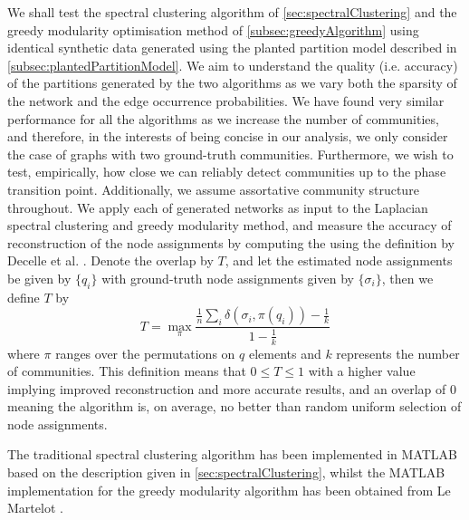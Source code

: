 We shall test the spectral clustering algorithm of \cref{sec:spectralClustering} and the greedy modularity optimisation method of \cref{subsec:greedyAlgorithm} using identical synthetic data generated using the planted partition model described in \cref{subsec:plantedPartitionModel}.
We aim to understand the quality (i.e. accuracy) of the partitions generated by the two algorithms as we vary both the sparsity of the network and the edge occurrence probabilities.
We have found very similar performance for all the algorithms as we increase the number of communities, and therefore, in the interests of being concise in our analysis, we only consider the case of graphs with two ground-truth communities.
Furthermore, we wish to test, empirically, how close we can reliably detect communities up to the phase transition point.
Additionally, we assume assortative community structure throughout.
We apply each of generated networks as input to the Laplacian spectral clustering and greedy modularity method, and measure the accuracy of reconstruction of the node assignments by computing the  using the definition by Decelle et al. \cite{DKM+11,DKM+13}.
Denote the overlap by $T$, and let the estimated node assignments be given by $\{q_{i}\}$ with ground-truth node assignments given by $\{\sigma_{i}\}$, then we define $T$ by
\begin{equation}
	\label{eq:overlap}
	T = \max_{\pi} \frac{\frac{1}{n} \sum_{i} \delta(\sigma_{i},\pi(q_{i})) - \frac{1}{k}}{1 - \frac{1}{k}}
\end{equation}
where $\pi$ ranges over the permutations on $q$ elements and $k$ represents the number of communities.
This definition means that $0 \le T \le 1$ with a higher value implying improved reconstruction and more accurate results, and an overlap of 0 meaning the algorithm is, on average, no better than random uniform selection of node assignments.

The traditional spectral clustering algorithm  has been implemented in MATLAB based on the description given in \cref{sec:spectralClustering}, whilst the MATLAB implementation for the greedy modularity algorithm has been obtained from Le Martelot \cite{ELM}.

